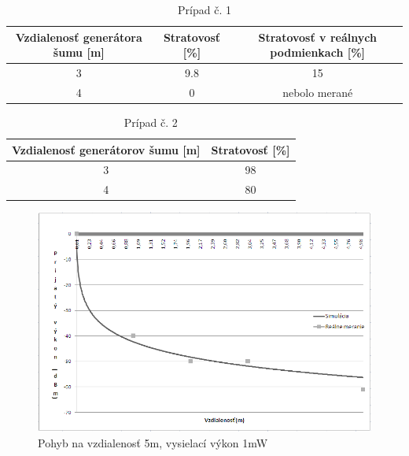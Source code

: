 \documentclass[11pt,twoside,a4paper]{book}
\begin{document}
\begin{table}[htbp]
\begin{center}
\begin{tabular}{|c|c|c|}
\hline Vzdialenosť generátora šumu [m] & Stratovosť [\%] & Stratovosť v reálnych podmienkach [\%]\\ 
\hline 3 & 9.8 &15\\ 
\hline 4 & 0 & nebolo merané\\ 
\hline 
\end{tabular} 
\end{center}
\caption{Prípad č. 1}
\label{tab:stratovost2}
\end{table}

\begin{table}[htbp]
\begin{center}
\begin{tabular}{|c|c|}
\hline Vzdialenosť generátorov šumu [m] & Stratovosť [\%] \\ 
\hline 3 & 98\\ 
\hline 4 & 80\\ 
\hline 
\end{tabular} 
\end{center}
\caption{Prípad č. 2}
\label{tab:stratovost3}
\end{table}



\begin{figure}[htbp]
 \centering
 \includegraphics[width=13cm]{./figures/results/5m-1mw.png}
 \caption{Pohyb na vzdialenosť 5m, vysielací výkon 1mW}
 \label{fig:5m-1mW}
\end{figure}
\end{document}

